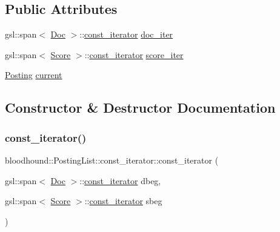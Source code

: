 \subsection*{Public Attributes}
\begin{DoxyCompactItemize}
\item 
gsl\+::span$<$ \mbox{\hyperlink{structbloodhound_1_1Doc}{Doc}} $>$\+::\mbox{\hyperlink{structbloodhound_1_1PostingList_1_1const__iterator}{const\+\_\+iterator}} \mbox{\hyperlink{structbloodhound_1_1PostingList_1_1const__iterator_a6eddc76eb3741c66f9bf3b7d99312087}{doc\+\_\+iter}}
\item 
gsl\+::span$<$ \mbox{\hyperlink{structbloodhound_1_1Score}{Score}} $>$\+::\mbox{\hyperlink{structbloodhound_1_1PostingList_1_1const__iterator}{const\+\_\+iterator}} \mbox{\hyperlink{structbloodhound_1_1PostingList_1_1const__iterator_ade7c448dfba393cc9e34a901461b6b77}{score\+\_\+iter}}
\item 
\mbox{\hyperlink{structbloodhound_1_1Posting}{Posting}} \mbox{\hyperlink{structbloodhound_1_1PostingList_1_1const__iterator_a97406308f5973366ea220f68c0d515d7}{current}}
\end{DoxyCompactItemize}


\subsection{Constructor \& Destructor Documentation}
\mbox{\label{structbloodhound_1_1PostingList_1_1const__iterator_acdd2e534f35cf6e082cc9d126b36f3b4}} 
\subsubsection{\texorpdfstring{const\+\_\+iterator()}{const\_iterator()}}
{\footnotesize\ttfamily bloodhound\+::\+Posting\+List\+::const\+\_\+iterator\+::const\+\_\+iterator (\begin{DoxyParamCaption}\item[{gsl\+::span$<$ \mbox{\hyperlink{structbloodhound_1_1Doc}{Doc}} $>$\+::\mbox{\hyperlink{structbloodhound_1_1PostingList_1_1const__iterator}{const\+\_\+iterator}}}]{dbeg,  }\item[{gsl\+::span$<$ \mbox{\hyperlink{structbloodhound_1_1Score}{Score}} $>$\+::\mbox{\hyperlink{structbloodhound_1_1PostingList_1_1const__iterator}{const\+\_\+iterator}}}]{sbeg }\end{DoxyParamCaption})\hspace{0.3cm}{\ttfamily [inline]}}



